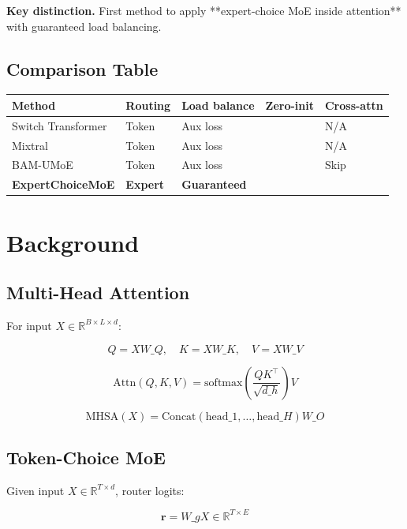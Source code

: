 \textbf{Key distinction.} First method to apply **expert-choice MoE inside 
attention** with guaranteed load balancing.



\subsection{Comparison Table}

\begin{table}[H]
\centering
\small
\begin{tabular}{lllll}
\toprule
\textbf{Method} & \textbf{Routing} & \textbf{Load balance} & \textbf{Zero-init} & \textbf{Cross-attn} \\
\midrule
Switch Transformer & Token & Aux loss &  & N/A \\
Mixtral & Token & Aux loss &  & N/A \\
BAM-UMoE & Token & Aux loss &  & Skip \\
\textbf{ExpertChoiceMoE} & \textbf{Expert} & \textbf{Guaranteed} &  &  \\
\bottomrule
\end{tabular}
\end{table}



\section{Background}

\subsection{Multi-Head Attention}

For input $X \in \mathbb{R}^{B \times L \times d}$:

\[
Q = X W\_Q, \quad K = X W\_K, \quad V = X W\_V
\tag{3.1}
\]

\[
\text{Attn}(Q, K, V) = \text{softmax}\!\left(\frac{Q K^\top}{\sqrt{d\_h}}\right) V
\tag{3.2}
\]

\[
\text{MHSA}(X) = \text{Concat}(\text{head}\_1, \dots, \text{head}\_H) W\_O
\tag{3.3}
\]

\subsection{Token-Choice MoE}

Given input $X \in \mathbb{R}^{T \times d}$, router logits:

\[
\mathbf{r} = W\_g X \in \mathbb{R}^{T \times E}
\tag{3.4}
\]

